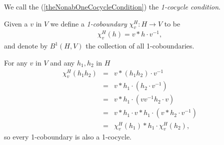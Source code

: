 We call the (\ref{theNonabOneCocycleCondition}) the \emph{1-cocycle condition}.



Given a $v$ in $V$ we define a \emph{1-coboundary} $\chi^H_v:H\rightarrow V$ to be
\begin{eqnarray*}
	\chi^H_v (h) = v * h\cdot v^{-1},
\end{eqnarray*}
and denote by $B^1\left(H, V\right)$ the collection of all 1-coboundaries. 

For any $v$ in $V$ and any $h_1, h_2$ in $H$
\begin{eqnarray*}
	\chi^H_v(h_1h_2) &=& v * (h_1h_2)\cdot v^{-1} \\
	&=& v * h_1 \cdot \left(h_2\cdot v^{-1} \right)\\
	&=& v * h_1 \cdot \left(v v^{-1} h_2\cdot v \right)\\
	&=& v * h_1\cdot v * h_1\cdot \left( v * h_2\cdot v^{-1}\right)\\
	&=& \chi^H_v(h_1) * h_1\cdot \chi^H_v(h_2),
\end{eqnarray*}
so every 1-coboundary is also a 1-cocycle. 

